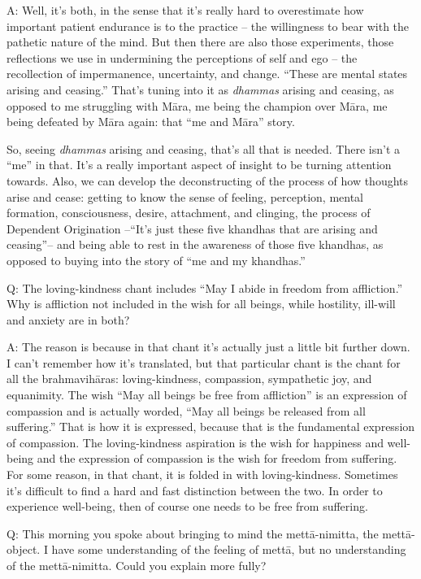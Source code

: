 \qaspace
A: Well, it’s both, in the sense that it’s really hard to overestimate
how important patient endurance is to the practice – the willingness to
bear with the pathetic nature of the mind. But then there are also those
experiments, those reflections we use in undermining the perceptions of
self and ego – the recollection of impermanence, uncertainty, and
change. “These are mental states arising and ceasing.” That’s tuning
into it as \emph{dhammas} arising and ceasing, as opposed to me
struggling with Māra, me being the champion over Māra, me being defeated
by Māra again: that “me and Māra” story.

So, seeing \emph{dhammas} arising and ceasing, that’s all that is
needed. There isn’t a “me” in that. It’s a really important aspect of
insight to be turning attention towards. Also, we can develop the
deconstructing of the process of how thoughts arise and cease: getting
to know the sense of feeling, perception, mental formation,
consciousness, desire, attachment, and clinging, the process of
Dependent Origination –“It’s just these five khandhas that are arising
and ceasing”– and being able to rest in the awareness of those five
khandhas, as opposed to buying into the story of “me and my khandhas.”

\qaspace
Q: The loving-kindness chant includes “May I abide in freedom from
affliction.” Why is affliction not included in the wish for all beings,
while hostility, ill-will and anxiety are in both?

\qaspace
A: The reason is because in that chant it’s actually just a little bit
further down. I can’t remember how it’s translated, but that particular
chant is the chant for all the brahmavihāras: loving-kindness,
compassion, sympathetic joy, and equanimity. The wish “May all beings be
free from affliction” is an expression of compassion and is actually
worded, “May all beings be released from all suffering.” That is how it
is expressed, because that is the fundamental expression of compassion.
The loving-kindness aspiration is the wish for happiness and well-being
and the expression of compassion is the wish for freedom from suffering.
For some reason, in that chant, it is folded in with loving-kindness.
Sometimes it’s difficult to find a hard and fast distinction between the
two. In order to experience well-being, then of course one needs to be
free from suffering.

\qaspace
Q: This morning you spoke about bringing to mind the mettā-nimitta, the
mettā-object. I have some understanding of the feeling of mettā, but no
understanding of the mettā-nimitta. Could you explain more fully?

